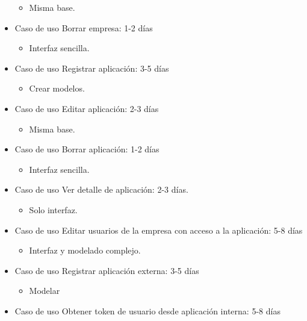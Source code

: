 \documentclass[12pt,a4paperpaper,]{report}
\providecommand{\tightlist}{%
  \setlength{\itemsep}{0pt}\setlength{\parskip}{0pt}}
\begin{document}
\begin{itemize}
  \begin{itemize}
  \tightlist
  \item
    Misma base.
  \end{itemize}
\item
  Caso de uso Borrar empresa: 1-2 días

  \begin{itemize}
  \tightlist
  \item
    Interfaz sencilla.
  \end{itemize}
\item
  Caso de uso Registrar aplicación: 3-5 días

  \begin{itemize}
  \tightlist
  \item
    Crear modelos.
  \end{itemize}
\item
  Caso de uso Editar aplicación: 2-3 días

  \begin{itemize}
  \tightlist
  \item
    Misma base.
  \end{itemize}
\item
  Caso de uso Borrar aplicación: 1-2 días

  \begin{itemize}
  \tightlist
  \item
    Interfaz sencilla.
  \end{itemize}
\item
  Caso de uso Ver detalle de aplicación: 2-3 días.

  \begin{itemize}
  \tightlist
  \item
    Solo interfaz.
  \end{itemize}
\item
  Caso de uso Editar usuarios de la empresa con acceso a la aplicación:
  5-8 días

  \begin{itemize}
  \tightlist
  \item
    Interfaz y modelado complejo.
  \end{itemize}
\item
  Caso de uso Registrar aplicación externa: 3-5 días

  \begin{itemize}
  \tightlist
  \item
    Modelar
  \end{itemize}
\item
  Caso de uso Obtener token de usuario desde aplicación interna: 5-8
  días


\end{itemize}
\end{document}
